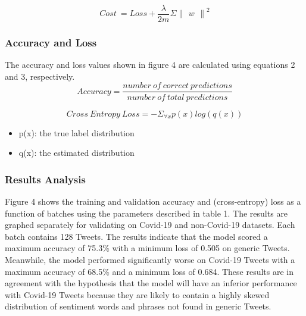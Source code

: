 \documentclass[letterpaper]{article} %
\begin{document}
\begin{equation}
  Cost\ = Loss +  \frac{\lambda}{2m} \Sigma  \begin{Vmatrix}w\end{Vmatrix}^2
  \label{}
\end{equation}

\subsubsection{Accuracy and Loss}
The accuracy and loss values shown in figure 4 are calculated using equations 2 and 3, respectively.
\begin{equation}
  Accuracy=\frac{number\ of\ correct\ predictions}{number\ of\ total\ predictions}
  \label{}
\end{equation}

\begin{equation}
  Cross\ Entropy\ Loss=-\Sigma_{\forall x}p(x) log(q(x))
  \label{}
\end{equation}

\begin{itemize}
  \item p(x): the true label distribution
  \item q(x): the estimated distribution
\end{itemize}

\subsubsection{Results Analysis}
Figure 4 shows the training and validation accuracy and (cross-entropy) loss as a function of batches using the parameters described in table 1. The results are graphed separately for validating on Covid-19 and non-Covid-19 datasets. Each batch contains 128 Tweets. The results indicate that the model scored a maximum accuracy of 75.3\% with a minimum loss of 0.505 on generic Tweets. Meanwhile, the model performed significantly worse on Covid-19 Tweets with a maximum accuracy of 68.5\% and a minimum loss of 0.684. These results are in agreement with the hypothesis that the model will have an inferior performance with Covid-19 Tweets because they are likely to contain a highly skewed distribution of sentiment words and phrases not found in generic Tweets.
\end{document}
